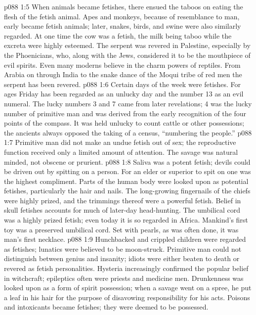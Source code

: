 \vs p088 1:5 When animals became fetishes, there ensued the taboos on eating the flesh of the fetish animal. Apes and monkeys, because of resemblance to man, early became fetish animals; later, snakes, birds, and swine were also similarly regarded. At one time the cow was a fetish, the milk being taboo while the excreta were highly esteemed. The serpent was revered in Palestine, especially by the Phoenicians, who, along with the Jews, considered it to be the mouthpiece of evil spirits. Even many moderns believe in the charm powers of reptiles. From Arabia on through India to the snake dance of the Moqui tribe of red men the serpent has been revered.
\vs p088 1:6 Certain days of the week were fetishes. For ages Friday has been regarded as an unlucky day and the number 13 as an evil numeral. The lucky numbers 3 and 7 came from later revelations; 4 was the lucky number of primitive man and was derived from the early recognition of the four points of the compass. It was held unlucky to count cattle or other possessions; the ancients always opposed the taking of a census, “numbering the people.”
\vs p088 1:7 Primitive man did not make an undue fetish out of sex; the reproductive function received only a limited amount of attention. The savage was natural minded, not obscene or prurient.
\vs p088 1:8 Saliva was a potent fetish; devils could be driven out by spitting on a person. For an elder or superior to spit on one was the highest compliment. Parts of the human body were looked upon as potential fetishes, particularly the hair and nails. The long\hyp{}growing fingernails of the chiefs were highly prized, and the trimmings thereof were a powerful fetish. Belief in skull fetishes accounts for much of later\hyp{}day head\hyp{}hunting. The umbilical cord was a highly prized fetish; even today it is so regarded in Africa. Mankind’s first toy was a preserved umbilical cord. Set with pearls, as was often done, it was man’s first necklace.
\vs p088 1:9 Hunchbacked and crippled children were regarded as fetishes; lunatics were believed to be moon\hyp{}struck. Primitive man could not distinguish between genius and insanity; idiots were either beaten to death or revered as fetish personalities. Hysteria increasingly confirmed the popular belief in witchcraft; epileptics often were priests and medicine men. Drunkenness was looked upon as a form of spirit possession; when a savage went on a spree, he put a leaf in his hair for the purpose of disavowing responsibility for his acts. Poisons and intoxicants became fetishes; they were deemed to be possessed.
